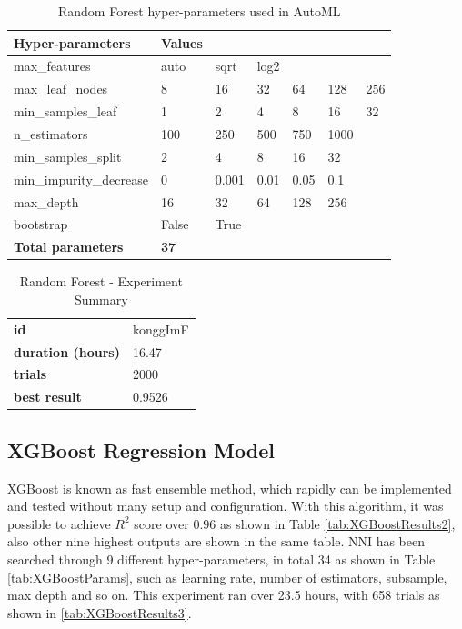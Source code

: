 \begin{table}[!htpb]
\small
\centering
\caption{Random Forest hyper-parameters used in AutoML}
\label{tab:RFResults2}
\begin{tabular}{lllllll} \hline
\textbf{Hyper-parameters} & \textbf{Values} &  &  &  &  &  \\ \hline
max\_features & auto & sqrt & log2 &  &  &  \\
max\_leaf\_nodes & 8 & 16 & 32 & 64 & 128 & 256 \\
min\_samples\_leaf & 1 & 2 & 4 & 8 & 16 & 32 \\
n\_estimators & 100 & 250 & 500 & 750 & 1000 &  \\
min\_samples\_split & 2 & 4 & 8 & 16 & 32 &  \\
min\_impurity\_decrease & 0 & 0.001 & 0.01 & 0.05 & 0.1 &  \\
max\_depth & 16 & 32 & 64 & 128 & 256 &  \\
bootstrap & False & True &  &  &  &  \\ \hline
\textbf{Total parameters} & \textbf{37} &  &  &  &  & \\ \hline
\end{tabular}
\end{table}


\begin{table}[!htpb]
\small
\centering
\caption{Random Forest - Experiment Summary}
\label{tab:RFResults3}
\begin{tabular}{ll} \hline
\textbf{id} & konggImF \\
\textbf{duration (hours)} & 16.47 \\
\textbf{trials} & 2000 \\
\textbf{best result} & 0.9526 \\ \hline
\end{tabular}
\end{table}


\subsection{XGBoost Regression Model}
XGBoost is known as fast ensemble method, which rapidly can be implemented and tested without many setup and configuration. With this algorithm, it was possible to achieve $R^2$ score over $0.96$ as shown in Table \ref{tab:XGBoostResults2}, also other nine highest outputs are shown in the same table. NNI has been searched through 9 different hyper-parameters, in total 34 as shown in Table \ref{tab:XGBoostParams}, such as learning rate, number of estimators, subsample, max depth and so on. This experiment ran over 23.5 hours, with 658 trials as shown in \ref{tab:XGBoostResults3}.

